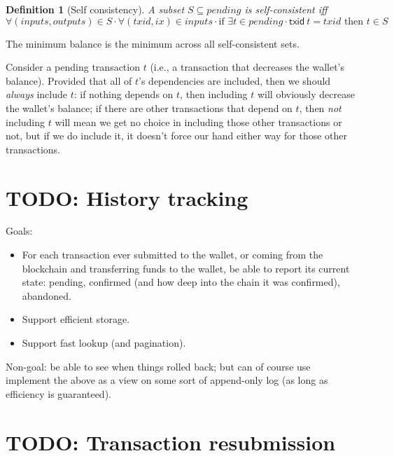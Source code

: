 \documentclass{article}
\newtheorem{definition}{Definition}
\begin{document}
\begin{definition}[Self consistency]
A subset $S \subseteq \mathit{pending}$ is \emph{self-consistent} iff
%
\begin{equation*}
\forall (\mathit{inputs}, \mathit{outputs}) \in S \cdot
\forall (\mathit{txid}, \mathit{ix}) \in \mathit{inputs} \cdot
\text{if } \exists t \in \mathit{pending} \cdot \mathsf{txid} ~ t = \mathit{txid}
\text{ then } t \in S
\end{equation*}
\end{definition}

The minimum balance is the minimum across all self-consistent sets.


Consider a pending transaction $t$ (i.e., a transaction that decreases
the wallet's balance). Provided that all of $t$'s dependencies are included,
then we should \emph{always} include $t$: if nothing depends on $t$, then
including $t$ will obviously decrease the wallet's balance; if there are
other transactions that depend on $t$, then \emph{not} including $t$ will
mean we get no choice in including those other transactions or not, but
if we do include it, it doesn't force our hand either way for those
other transactions.




\section{TODO: History tracking}

Goals:

\begin{itemize}
\item For each transaction ever submitted to the wallet, or coming from the
blockchain and transferring funds to the wallet, be able to report its current
state: pending, confirmed (and how deep into the chain it was confirmed),
abandoned.
\item Support efficient storage.
\item Support fast lookup (and pagination).
\end{itemize}

Non-goal: be able to see when things rolled back; but can of course use
implement the above as a view on some sort of append-only log
(as long as efficiency is guaranteed).

\section{TODO: Transaction resubmission}
\end{document}
